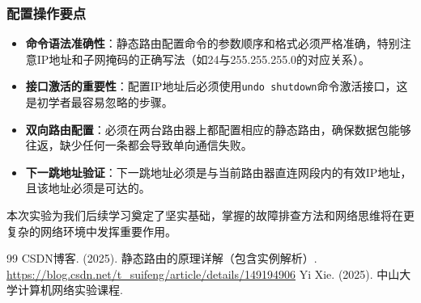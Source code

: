 \documentclass[a4paper]{article}
\begin{document}
\subsubsection{配置操作要点}
\begin{itemize}
    \item \textbf{命令语法准确性}：静态路由配置命令的参数顺序和格式必须严格准确，特别注意IP地址和子网掩码的正确写法（如24与255.255.255.0的对应关系）。
    \item \textbf{接口激活的重要性}：配置IP地址后必须使用\texttt{undo shutdown}命令激活接口，这是初学者最容易忽略的步骤。
    \item \textbf{双向路由配置}：必须在两台路由器上都配置相应的静态路由，确保数据包能够往返，缺少任何一条都会导致单向通信失败。
    \item \textbf{下一跳地址验证}：下一跳地址必须是与当前路由器直连网段内的有效IP地址，且该地址必须是可达的。
\end{itemize}

本次实验为我们后续学习奠定了坚实基础，掌握的故障排查方法和网络思维将在更复杂的网络环境中发挥重要作用。

\begin{thebibliography}{99}  
    CSDN博客. (2025). 静态路由的原理详解（包含实例解析）. \url{https://blog.csdn.net/t_suifeng/article/details/149194906}
    Yi Xie. (2025). 中山大学计算机网络实验课程.
    

\end{thebibliography}
\end{document}
